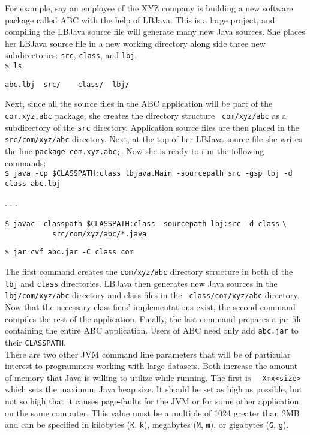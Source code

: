 For example, say an employee of the XYZ company is building a new software
package called ABC with the help of LBJava.  This is a large project, and
compiling the LBJava source file will generate many new Java sources.  She places
her LBJava source file in a new working directory along side three new
subdirectories: {\tt src}, {\tt class}, and {\tt lbj}. \\

\vspace{-.25cm}
{\tt \$ ls}

\verb|abc.lbj  src/    class/  lbj/| \\
\vspace{-.25cm}

\noindent
Next, since all the source files in the ABC application will be part of the
{\tt com.xyz.abc} package, she creates the directory structure {\tt
com/xyz/abc} as a subdirectory of the {\tt src} directory.  Application source
files are then placed in the {\tt src/com/xyz/abc} directory.  Next, at the
top of her LBJava source file she writes the line {\tt package com.xyz.abc;}.
Now she is ready to run the following commands: \\

\vspace{-.25cm}
{\tt \$ java -cp \$CLASSPATH:class lbjava.Main -sourcepath src -gsp lbj -d class
  abc.lbj}

. . .

{\tt \$ javac -classpath \$CLASSPATH:class -sourcepath lbj:src -d class}
\verb|\| \\
\verb|           src/com/xyz/abc/*.java|

{\tt \$ jar cvf abc.jar -C class com} \\
\vspace{-.25cm}

\noindent
The first command creates the {\tt com/xyz/abc} directory structure in both of
the {\tt lbj} and {\tt class} directories.  LBJava then generates new Java
sources in the {\tt lbj/com/xyz/abc} directory and class files in the {\tt
class/com/xyz/abc} directory.  Now that the necessary classifiers'
implementations exist, the second command compiles the rest of the
application.  Finally, the last command prepares a jar file containing the
entire ABC application.  Users of ABC need only add {\tt abc.jar} to their
{\tt CLASSPATH}. \\

There are two other JVM command line parameters that will be of particular
interest to programmers working with large datasets.  Both increase the amount
of memory that Java is willing to utilize while running.  The first is {\tt
-Xmx<size>} which sets the maximum Java heap size.  It should be set as high
as possible, but not so high that it causes page-faults for the JVM or for
some other application on the same computer.  This value must be a multiple of
1024 greater than 2MB and can be specified in kilobytes ({\tt K}, {\tt k}),
megabytes ({\tt M}, {\tt m}), or gigabytes ({\tt G}, {\tt g}). \\

